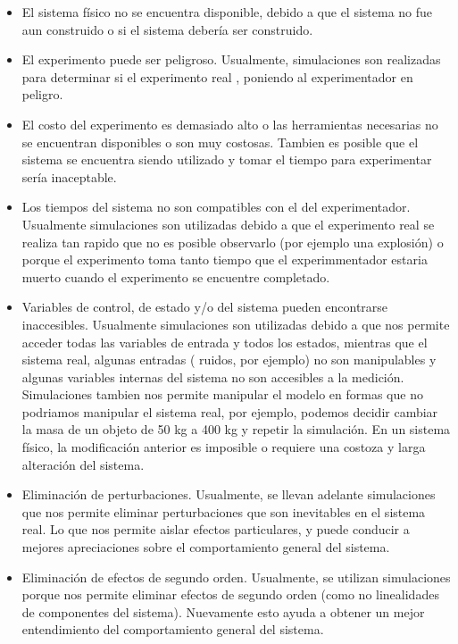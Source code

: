 \begin{itemize}
	\item El sistema físico no se encuentra disponible, debido a que el sistema no fue aun construido o si el sistema debería ser construido. 
	
	\item El experimento puede ser peligroso. Usualmente, simulaciones son realizadas para determinar si el experimento real , poniendo al experimentador en peligro.

	\item El costo del experimento es demasiado alto o las herramientas necesarias no se encuentran disponibles o son muy costosas. Tambien es posible que el sistema se encuentra siendo utilizado y tomar el tiempo para experimentar sería inaceptable.

	\item Los tiempos del sistema no son compatibles con el del experimentador. Usualmente simulaciones son utilizadas debido a que el experimento real se realiza tan rapido que no es posible observarlo (por ejemplo una explosión) o porque el experimento toma tanto tiempo que el experimmentador estaria muerto cuando el experimento se encuentre completado.

	\item Variables de control, de estado y/o del sistema pueden encontrarse inaccesibles. Usualmente simulaciones son utilizadas debido a que nos permite acceder todas las variables de entrada y todos los estados, mientras que el sistema real, algunas entradas ( ruidos, por ejemplo) no son manipulables y algunas variables internas del sistema no son accesibles a la medición. Simulaciones tambien nos permite manipular el modelo en formas que no podriamos manipular el sistema real, por ejemplo, podemos decidir cambiar la masa de un objeto de 50 kg a 400 kg y repetir la simulación. En un sistema físico, la modificación anterior es imposible o requiere una costoza y larga alteración del sistema.

	\item Eliminación de perturbaciones. Usualmente, se llevan adelante simulaciones que nos permite eliminar perturbaciones que son inevitables en el sistema real. Lo que nos permite aislar efectos particulares, y puede conducir a mejores apreciaciones sobre el comportamiento general del sistema.

	\item Eliminación de efectos de segundo orden. Usualmente, se utilizan simulaciones porque nos permite eliminar efectos de segundo orden (como no linealidades de componentes del sistema). Nuevamente esto ayuda a obtener un mejor entendimiento del comportamiento general del sistema.
\end{itemize}

